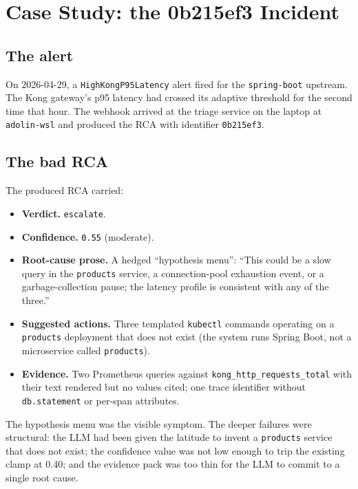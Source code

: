 \documentclass[11pt,a4paper,oneside]{report}
\begin{document}
\chapter{Case Study: the 0b215ef3 Incident}
\label{ch:case-study}

\section{The alert}

On 2026-04-29, a \texttt{HighKongP95Latency} alert fired for the
\texttt{spring-boot} upstream.  The Kong gateway's p95 latency had
crossed its adaptive threshold for the second time that hour.  The
webhook arrived at the triage service on the laptop at
\texttt{adolin-wsl} and produced the RCA with identifier
\texttt{0b215ef3}.

\section{The bad RCA}

The produced RCA carried:

\begin{itemize}
  \item \textbf{Verdict.} \texttt{escalate}.
  \item \textbf{Confidence.} \texttt{0.55} (moderate).
  \item \textbf{Root-cause prose.}  A hedged ``hypothesis menu'':
        ``This could be a slow query in the
        \texttt{products} service, a connection-pool exhaustion event,
        or a garbage-collection pause; the latency profile is
        consistent with any of the three.''
  \item \textbf{Suggested actions.}  Three templated \texttt{kubectl}
        commands operating on a \texttt{products} deployment that does
        not exist (the system runs Spring Boot, not a microservice
        called \texttt{products}).
  \item \textbf{Evidence.}  Two Prometheus queries against
        \texttt{kong\_http\_requests\_total} with their text rendered
        but no values cited; one trace identifier without
        \texttt{db.statement} or per-span attributes.
\end{itemize}

\begin{warnbox}[title={Why the operator caught it}]
The hypothesis menu was the visible symptom.  The deeper failures
were structural: the LLM had been given the latitude to invent a
\texttt{products} service that does not exist; the confidence value
was not low enough to trip the existing clamp at 0.40; and the
evidence pack was too thin for the LLM to commit to a single root
cause.
\end{warnbox}
\end{document}

